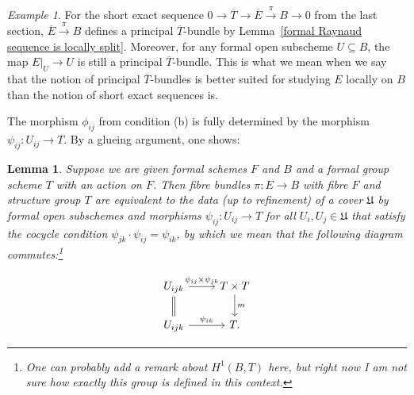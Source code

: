 \documentclass[11pt,oneside]{amsart}
\newtheorem{lemma}[theorem]{Lemma}
\theoremstyle{definition}
\theoremstyle{remark}
\newtheorem*{example}{Example}
\begin{document}
	\begin{example}
		For the short exact sequence $0\rightarrow \overline{T}\rightarrow \overline{E}\xrightarrow{\pi} B\rightarrow 0$ from the last section, $\overline{E}\xrightarrow{\pi} B$ defines a principal $\overline{T}$-bundle by Lemma~\ref{formal Raynaud sequence is locally split}. Moreover, for any formal open subscheme $U\subseteq B$, the map $E|_U\rightarrow U$ is still a principal $\overline{T}$-bundle. This is what we mean when we say that the notion of principal $\overline{T}$-bundles is better suited for studying $E$ locally on $B$ than the notion of short exact sequences is.
	\end{example}
	
	The morphism $\phi_{ij}$ from condition (b) is fully determined by the morphism $\psi_{ij}:U_{ij}\rightarrow T$. By a glueing argument, one shows:
	\begin{lemma}\label{equivalent characterisation of principal $T$-bundle}
		Suppose we are given formal schemes $F$ and $B$ and a formal group scheme $T$ with an action on $F$. Then fibre bundles $\pi:E\rightarrow B$ with fibre $F$ and structure group $T$ are equivalent to the data (up to refinement) of a cover $\mathfrak U$ by formal open subschemes and morphisms $\psi_{ij}:U_{ij}\rightarrow T$ for all $U_i,U_j\in \mathfrak U$ that satisfy the cocycle condition $\psi_{jk}\cdot \psi_{ij}=\psi_{ik}$, by which we mean that the following diagram commutes:\footnote{One can probably add a remark about $H^1(B,T)$ here, but right now I am not sure how exactly this group is defined in this context.}
		
		\begin{center}\begin{equation}		\label{cocycle condition of fibre bundle}
			\begin{tikzcd}
			U_{ijk} \arrow[r, "\psi_{ij}\times\psi_{jk}"] \arrow[d,equal] & T\times T \arrow[d, "m"] \\
			U_{ijk} \arrow[r, "\psi_{ik}"] & T.
			\end{tikzcd}
			\end{equation}
		\end{center}
	\end{lemma}
	
\end{document}
